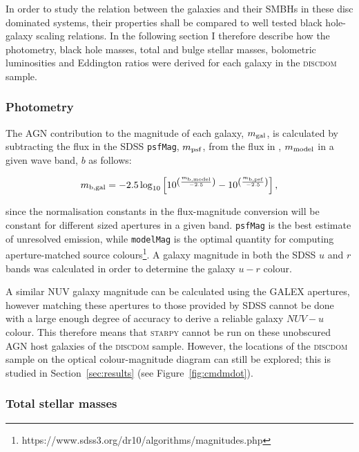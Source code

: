 In order to study the relation between the galaxies and their SMBHs in these disc dominated systems, their properties shall be compared to well tested black hole-galaxy scaling relations. In the following section I therefore describe how the photometry, black hole masses, total and bulge stellar masses, bolometric luminosities and Eddington ratios were derived for each galaxy in the \textsc{discdom} sample. 

\subsubsection{Photometry}\label{sec:photo}

The AGN contribution to the magnitude of each galaxy, $m_{\rm{gal}}$, is calculated by subtracting the flux in the SDSS {\tt psfMag}, $m_{\rm{psf}}$, from the flux in {}, $m_{\rm{model}}$ in a given wave band, $b$ as follows:

\begin{equation}\label{galmag}
m_{\rm{b, gal}} = -2.5 \log_{10} \left[ 10^{\left(\frac{m_{\rm{b, model}}}{-2.5}\right)} - 10^{\left(\frac{m_{\rm{b, psf}}}{-2.5}\right)} \right],
\end{equation}

since the normalisation constants in the flux-magnitude conversion will be constant for different sized apertures in a given band. {\tt psfMag} is the best estimate of unresolved emission, while {\tt modelMag} is the optimal quantity for computing aperture-matched source colours\footnote{https://www.sdss3.org/dr10/algorithms/magnitudes.php}. A galaxy magnitude in both the SDSS $u$ and $r$ bands was calculated in order to determine the galaxy $u-r$ colour. 

A similar NUV galaxy magnitude can be calculated using the GALEX apertures, however matching these apertures to those provided by SDSS cannot be done with a large enough degree of accuracy to derive a reliable galaxy $NUV-u$ colour. This therefore means that \textsc{starpy} cannot be run on these unobscured AGN host galaxies of the \textsc{discdom} sample. However, the locations of the \textsc{discdom} sample on the optical colour-magnitude diagram can still be explored; this is studied in Section~\ref{sec:results} (see Figure~\ref{fig:cmdmdot}). 

\subsubsection{Total stellar masses}\label{sec:galmass}

